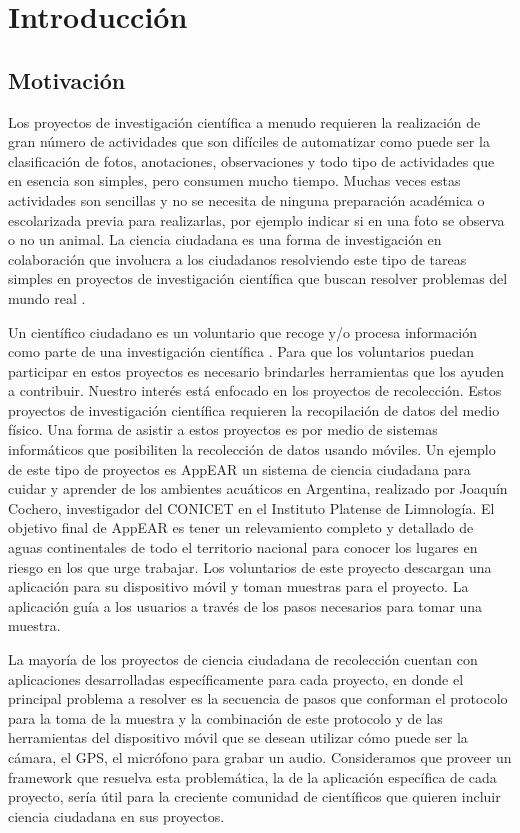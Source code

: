 \chapter{Introducción}

\label{introduccion}

\section{ Motivación } \label{sec:motivacion}

Los proyectos de investigación científica a menudo requieren la realización de gran número de actividades que son difíciles de automatizar como puede ser la clasificación de fotos, anotaciones, observaciones y todo tipo de actividades que en esencia son simples, pero consumen mucho tiempo. Muchas veces estas actividades son sencillas y no se necesita de ninguna preparación académica o escolarizada previa para realizarlas, por ejemplo indicar si en una foto se observa o no un animal. La ciencia ciudadana es una forma de investigación en colaboración que involucra a los ciudadanos resolviendo este tipo de tareas simples en proyectos de investigación científica que buscan resolver problemas del mundo real \cite{wiggins2011conservation}. 

Un científico ciudadano es un voluntario que recoge y/o procesa información como parte de una investigación científica \cite{silvertown2009new}. Para que los voluntarios puedan participar en estos proyectos es necesario brindarles herramientas que los ayuden a contribuir. 
Nuestro interés está enfocado en los proyectos de recolección. Estos proyectos de investigación científica requieren la recopilación de datos del medio físico. Una forma de asistir a estos proyectos es por medio de sistemas informáticos que posibiliten la recolección de datos usando móviles. Un ejemplo de este tipo de proyectos es AppEAR\cite{appEar} un sistema de ciencia ciudadana para cuidar y aprender de los ambientes acuáticos en Argentina, realizado por Joaquín Cochero, investigador del CONICET en el Instituto Platense de Limnología. El objetivo final de AppEAR es tener un relevamiento completo y detallado de aguas continentales de todo el territorio nacional para conocer los lugares en riesgo en los que urge trabajar. Los voluntarios de este proyecto descargan una aplicación para su dispositivo móvil y toman muestras para el proyecto. La aplicación guía a los usuarios a través de los pasos necesarios para tomar una muestra.

La mayoría de los proyectos de ciencia ciudadana de recolección cuentan con aplicaciones desarrolladas específicamente para cada proyecto, en donde el principal problema a resolver es la secuencia de pasos que conforman el protocolo para la toma de la muestra y la combinación de este protocolo y de las herramientas del dispositivo móvil que se desean utilizar cómo puede ser la cámara, el GPS, el micrófono para grabar un audio. Consideramos que proveer un framework que resuelva esta problemática, la de la aplicación específica de cada proyecto, sería útil para la creciente comunidad de científicos que quieren incluir ciencia ciudadana en sus proyectos.

